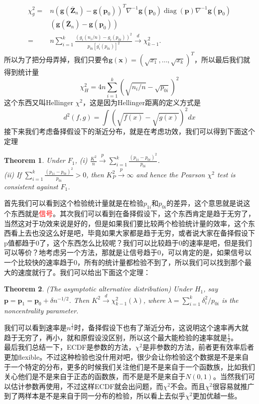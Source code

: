 \documentclass{article}
\newtheorem{theorem}{Theorem}[section]
\begin{document}
$$
\begin{aligned}
	\chi_g^2= & n\left(\mathbf{g}\left(\overline{\mathbf{Z}}_n\right)-\mathbf{g}\left(\mathbf{p}_0\right)\right)^T \nabla^{-1} \mathbf{g}\left(\mathbf{p}_0\right) \operatorname{diag}(\mathbf{p}) \nabla^{-1} \mathbf{g}\left(\mathbf{p}_0\right) \\
	& \left(\mathbf{g}\left(\overline{\mathbf{Z}}_n\right)-\mathbf{g}\left(\mathbf{p}_0\right)\right) \\
	= & n \sum_{i=1}^k \frac{\left(g_i\left(n_i / n\right)-g_i\left(p_{0 i}\right)\right)^2}{p_{0 i}\left[g_i^{\prime}\left(p_{0 i}\right)\right]^2} \stackrel{d}{\rightarrow} \chi_{k-1}^2 .
\end{aligned}
$$
所以为了把分母弄掉，我们只要令$\mathbf{g}(\mathbf{x})=\left(\sqrt{x_1}, \ldots, \sqrt{x_k}\right)^T$，所以最后我们就得到统计量
$$
\chi_H^2=4 n \sum_{i=1}^k\left(\sqrt{n_i / n}-\sqrt{p_{0 i}}\right)^2
$$
这个东西又叫Hellinger $\chi^2$，这是因为Hellinger距离的定义方式是
$$
d^2(f, g)=\int(\sqrt{f(x)}-\sqrt{g(x)})^2 d x
$$
接下来我们考虑备择假设下的渐近分布，就是在考虑功效，我们可以得到下面这个定理
\begin{theorem}
	Under $F_1$,
	(i) $\frac{K^2}{n} \stackrel{p}{\rightarrow} \sum_{i=1}^k \frac{\left(p_{1 i}-p_{0 i}\right)^2}{p_{0 i}}$.\\
	(ii) If $\sum_{i=1}^k \frac{\left(p_{1 i}-p_{0 i}\right)^2}{p_{0 i}}>0$, then $K_P^2 \stackrel{p}{\rightarrow} \infty$ and hence the Pearson $\chi^2$ test is consistent against $F_1$.
\end{theorem}
首先我们可以看到这个检验统计量就是在检验$p_{1i}$和$p_{0i}$的差异，这个意思就是说这个东西就是\textcolor{red}{信号}。其次我们可以看到在备择假设下，这个东西肯定是趋于无穷了，当然这对于功效来说是好的，但是如果我们要比较两个检验统计量的效率，这个东西看上去也没这么好是吧，毕竟如果大家都是趋于无穷，或者说大家在备择假设下p值都趋于0了，这个东西怎么比较呢？我们可以比较趋于0的速率是吧，但是我们可以等价？地考虑另一个方法，那就是让信号趋于0，可以肯定的是，如果信号以一个比较快的速率趋于0，所有的统计量都检验不到了，所以我们可以找到那个最大的速度就行了。我们可以给出下面这个定理：
\begin{theorem}
	(The asymptotic alternative distribution) Under $H_1$, say $\mathbf{p}=\mathbf{p}_1=\mathbf{p}_0+\delta n^{-1 / 2}$. Then $K^2 \stackrel{d}{\rightarrow} \chi_{k-1}^2(\lambda)$, where $\lambda=\sum_{i=1}^k \delta_i^2 / p_{0 i}$ is the noncentrality parameter.
\end{theorem}
我们可以看到速率是$n^{\frac{1}{2}}$时，备择假设下也有了渐近分布，这说明这个速率再大就趋于无穷了，再小，就和原假设没区别，所以这个最大能检验的速率就是$\frac{1}{2}$。\\
最后我们总结一下，ECDF是参数的方法，$\chi^2$是非参数的方法，前者更有效率后者更加flexible。不过这种检验也没什用对吧，很少会让你检验这个数据是不是来自于一个特定的分布，更多的时候我们关注他们是不是来自于一个函数族，比如我们关心他们是不是来自于正态的函数族，而不是是不是来自于$N(0,1)$。当然我们可以估计参数再使用，不过这样ECDF就会出问题，而$\chi^2$不会。而且$\chi^2$很容易就推广到了两样本是不是来自于同一分布的检验，所以看上去似乎$\chi^2$更加优越一些。
\end{document}
